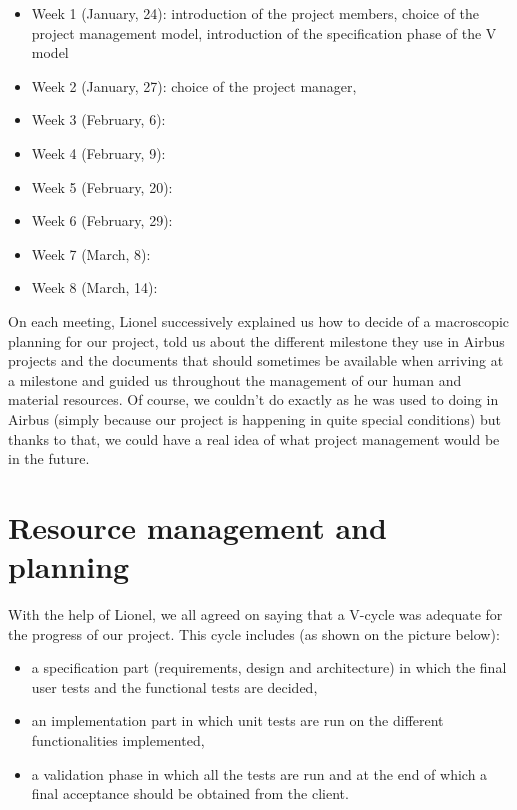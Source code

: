 \documentclass{report}
\begin{document}
\begin{itemize}
	\item Week 1 (January, 24): introduction of the project members, choice of the project management model, introduction of the specification phase of the V model
	\item Week 2 (January, 27): choice of the project manager, 
	\item Week 3 (February, 6):
	\item Week 4 (February, 9):
	\item Week 5 (February, 20):
	\item Week 6 (February, 29):
	\item Week 7 (March, 8):
	\item Week 8 (March, 14):
\end{itemize}

On each meeting, Lionel successively explained us how to decide of a macroscopic planning for our project, told us about the different milestone they use in Airbus projects and the documents that should sometimes be available when arriving at a milestone and guided us throughout the management of our human and material resources. Of course, we couldn't do exactly as he was used to doing in Airbus (simply because our project is happening in quite special conditions) but thanks to that, we could have a real idea of what project management would be in the future. 

\section{Resource management and planning}

With the help of Lionel, we all agreed on saying that a V-cycle was adequate for the progress of our project. This cycle includes (as shown on the picture below):

\begin{itemize}
	\item a specification part (requirements, design and architecture) in which the final user tests and the functional tests are decided,
	\item an implementation part in which unit tests are run on the different functionalities implemented,
	\item a validation phase in which all the tests are run and at the end of which a final acceptance should be obtained from the client.
\end{itemize}
\end{document}
